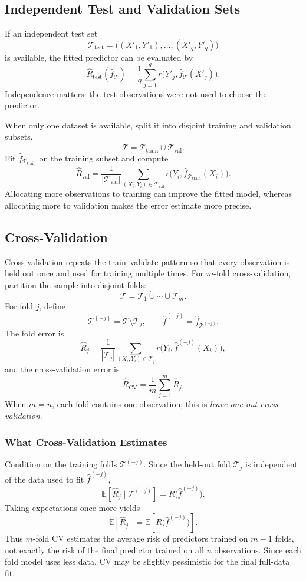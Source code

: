 \documentclass[12pt,oneside]{book}
\numberwithin{equation}{section}
\theoremstyle{definition}
\theoremstyle{plain}
\theoremstyle{remark}
\newcommand{\E}{\mathbb{E}}
\begin{document}
\subsection{Independent Test and Validation Sets}
If an independent test set
\[
\mathcal{T}_{\mathrm{test}}
=\bigl((X'_1,Y'_1),\ldots,(X'_q,Y'_q)\bigr)
\]
is available, the fitted predictor can be evaluated by
\[
\widehat R_{\mathrm{test}}(\widehat f_{\mathcal{T}})
=\frac1q\sum_{j=1}^q
r\bigl(Y'_j,\widehat f_{\mathcal{T}}(X'_j)\bigr).
\]
Independence matters: the test observations were not used to choose the
predictor.

When only one dataset is available, split it into disjoint training and
validation subsets,
\[
\mathcal{T}=\mathcal{T}_{\mathrm{train}}
\mathbin{\dot\cup}\mathcal{T}_{\mathrm{val}}.
\]
Fit $\widehat f_{\mathcal{T}_{\mathrm{train}}}$ on the training subset and
compute
\[
\widehat R_{\mathrm{val}}
=\frac{1}{|\mathcal{T}_{\mathrm{val}}|}
\sum_{(X_i,Y_i)\in\mathcal{T}_{\mathrm{val}}}
r\bigl(Y_i,\widehat f_{\mathcal{T}_{\mathrm{train}}}(X_i)\bigr).
\]
Allocating more observations to training can improve the fitted model, whereas
allocating more to validation makes the error estimate more precise.

\subsection{Cross-Validation}
Cross-validation repeats the train--validate pattern so that every observation
is held out once and used for training multiple times. For $m$-fold
cross-validation, partition the sample into disjoint folds:
\[
\mathcal{T}=\mathcal{T}_1\mathbin{\dot\cup}\cdots
\mathbin{\dot\cup}\mathcal{T}_m.
\]
For fold $j$, define
\[
\mathcal{T}^{(-j)}=\mathcal{T}\setminus\mathcal{T}_j,
\qquad
\widehat f^{(-j)}=\widehat f_{\mathcal{T}^{(-j)}}.
\]
The fold error is
\[
\widehat R_j
=\frac{1}{|\mathcal{T}_j|}
\sum_{(X_i,Y_i)\in\mathcal{T}_j}
r\bigl(Y_i,\widehat f^{(-j)}(X_i)\bigr),
\]
and the cross-validation error is
\[
\widehat R_{\mathrm{CV}}=\frac1m\sum_{j=1}^m\widehat R_j.
\]
When $m=n$, each fold contains one observation; this is
\emph{leave-one-out cross-validation}.

\subsubsection{What Cross-Validation Estimates}
Condition on the training folds $\mathcal{T}^{(-j)}$. Since the held-out fold
$\mathcal{T}_j$ is independent of the data used to fit
$\widehat f^{(-j)}$,
\[
\E\left[\widehat R_j\mid\mathcal{T}^{(-j)}\right]
=R\bigl(\widehat f^{(-j)}\bigr).
\]
Taking expectations once more yields
\[
\E[\widehat R_j]
=\E\left[R\bigl(\widehat f^{(-j)}\bigr)\right].
\]
Thus $m$-fold CV estimates the average risk of predictors trained on $m-1$
folds, not exactly the risk of the final predictor trained on all $n$
observations. Since each fold model uses less data, CV may be slightly
pessimistic for the final full-data fit.
\end{document}
